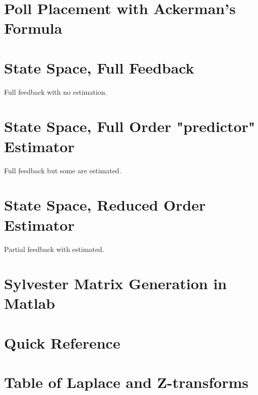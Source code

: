 \documentclass{article}
\begin{document}


\clearpage
\section{Poll Placement with Ackerman's Formula}

\section{State Space, Full Feedback}

Full feedback with no estimation.

\section{State Space, Full Order "predictor" Estimator}

Full feedback but some are estimated.

\section{State Space, Reduced Order Estimator}

Partial feedback with estimated.

\clearpage
\printbibliography[heading=bibintoc]

\clearpage
\appendix

\section{Sylvester Matrix Generation in Matlab}
\label{app:sylvester}




\section{Quick Reference}

\section{Table of Laplace and Z-transforms}
\end{document}
